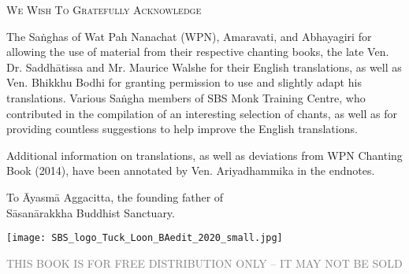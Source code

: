 \cleartorecto
\thispagestyle{empty}

{\setlength{\parskip}{10pt}

{\centering\fontsize{16}{25}\selectfont
\textsc{We Wish To Gratefully Acknowledge}
\par}

The Saṅghas of Wat Pah Nanachat (WPN), Amaravati, and Abhayagiri for allowing the use of material from their respective chanting books, the late Ven. Dr. Saddhātissa and Mr. Maurice Walshe for their English translations, as well as Ven. Bhikkhu Bodhi for granting permission to use and slightly adapt his translations. Various Saṅgha members of SBS Monk Training Centre, who contributed in the compilation of an interesting selection of chants, as well as for providing countless suggestions to help improve the English translations. 


Additional information on translations, as well as deviations\hyperlink{endnote1-appendix}{\hypertarget{endnote1-body}{}}
from WPN Chanting Book (2014), have been annotated by Ven. Ariyadhammika in the endnotes.

\medskip

{\centering
To Āyasmā Aggacitta, the founding father of\\
Sāsanārakkha Buddhist Sanctuary.

\medskip

\texttt{[image: SBS\_logo\_Tuck\_Loon\_BAedit\_2020\_small.jpg]}

{\centering\fontsize{10}{30}\selectfont
  \textsc{\textcolor{gray}{THIS BOOK IS FOR FREE DISTRIBUTION ONLY – IT MAY NOT BE SOLD}}
\par}

}

}
